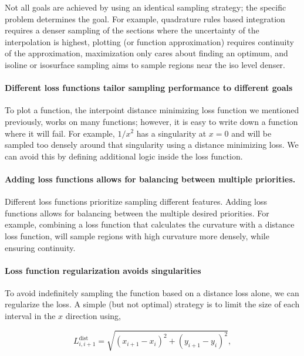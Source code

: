 \documentclass[english, twocolumn, 10pt, aps, superscriptaddress, floatfix, prb, citeautoscript]{revtex4-1}
\begin{document}
Not all goals are achieved by using an identical sampling strategy; the specific problem determines the goal.
For example, quadrature rules based integration requires a denser sampling of the sections where the uncertainty of the interpolation is highest, plotting (or function approximation) requires continuity of the approximation, maximization only cares about finding an optimum, and isoline or isosurface sampling aims to sample regions near the iso level denser.

\paragraph{Different loss functions tailor sampling performance to different goals}

To plot a function, the interpoint distance minimizing loss function we mentioned previously, works on many functions; however, it is easy to write down a function where it will fail.
For example, \(1/x^2\) has a singularity at \(x=0\) and will be sampled too densely around that singularity using a distance minimizing loss.
We can avoid this by defining additional logic inside the loss function.

\paragraph{Adding loss functions allows for balancing between multiple priorities.}

Different loss functions prioritize sampling different features.
Adding loss functions allows for balancing between the multiple desired priorities.
For example, combining a loss function that calculates the curvature with a distance loss function, will sample regions with high curvature more densely, while ensuring continuity.

\paragraph{Loss function regularization avoids singularities}

To avoid indefinitely sampling the function based on a distance loss alone, we can regularize the loss.
A simple (but not optimal) strategy is to limit the size of each interval in the \(x\) direction using,

\begin{equation*}
L_{i, i+1}^\textrm{dist}=\sqrt{(x_{i+1}-x_{i})^{2}+(y_{i+1}-y_{i})^{2}},
\end{equation*}
\end{document}
